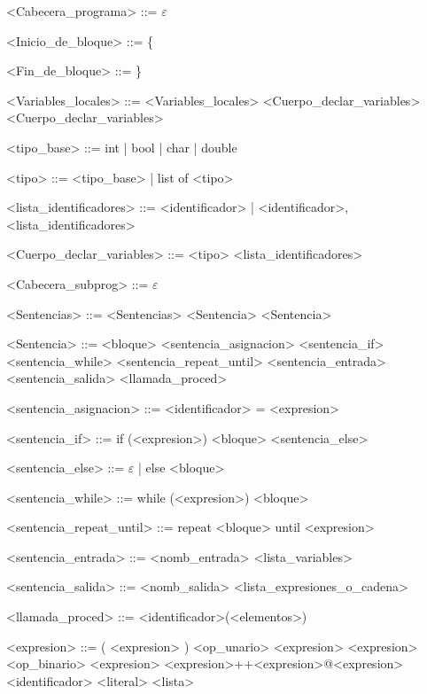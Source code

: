 \documentclass{scrartcl}
\begin{document}
\begin{grammar}
<Cabecera_programa> ::= $\varepsilon$

<Inicio_de_bloque> ::= \{

<Fin_de_bloque> ::= \}

<Variables_locales> ::= <Variables_locales> <Cuerpo_declar_variables>
\alt <Cuerpo_declar_variables>

<tipo_base> ::= int | bool | char | double

<tipo> ::= <tipo_base> | list of <tipo>

<lista_identificadores> ::= <identificador> | <identificador>, <lista_identificadores>

<Cuerpo_declar_variables> ::= <tipo> <lista_identificadores>

<Cabecera_subprog> ::= $\varepsilon$

<Sentencias> ::= <Sentencias> <Sentencia>
\alt <Sentencia>

<Sentencia> ::= <bloque>
\alt <sentencia_asignacion>
\alt <sentencia_if>
\alt <sentencia_while>
\alt <sentencia_repeat_until>
\alt <sentencia_entrada>
\alt <sentencia_salida>
\alt <llamada_proced>

<sentencia_asignacion> ::=  <identificador> = <expresion>

<sentencia_if> ::= if (<expresion>) <bloque> <sentencia_else>

<sentencia_else> ::= $\varepsilon$ | else <bloque>

<sentencia_while> ::= while (<expresion>) <bloque>

<sentencia_repeat_until> ::= repeat <bloque> until <expresion>

<sentencia_entrada> ::= <nomb_entrada> <lista_variables>

<sentencia_salida> ::= <nomb_salida> <lista_expresiones_o_cadena>

<llamada_proced> ::= <identificador>(<elementos>)

<expresion> ::= ( <expresion> )
\alt <op_unario> <expresion>
\alt <expresion> <op_binario> <expresion>
\alt <expresion>++<expresion>@<expresion>
\alt <identificador>
\alt <literal>
\alt <lista>

\end{grammar}
\end{document}

